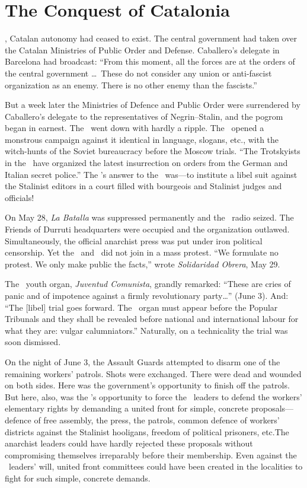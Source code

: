 \chapter{The Conquest of Catalonia}

, Catalan autonomy had ceased to exist. The central government had taken over the Catalan Ministries of Public Order and Defense. Caballero’s delegate in Barcelona had broadcast: ``From this moment, all the forces are at the orders of the central government \dots\ These do not consider any union or anti-fascist organization as an enemy. There is no other enemy than the fascists.''

But a week later the Ministries of Defence and Public Order were surrendered by Caballero’s delegate to the representatives of Negrin--Stalin, and the pogrom began in earnest. The \POUM\ went down with hardly a ripple. The \PSUC\ opened a monstrous campaign against it identical in language, slogans, etc., with the witch-hunts of the Soviet bureaucracy before the Moscow trials. ``The Trotskyists in the \POUM\ have organized the latest insurrection on orders from the German and Italian secret police.'' The \POUM’s answer to the \PSUC\ was---to institute a libel suit against the Stalinist editors in a court filled with bourgeois and Stalinist judges and officials!

On May 28, \emph{La Batalla} was suppressed permanently and the \POUM\ radio seized. The Friends of Durruti headquarters were occupied and the organization outlawed. Simultaneously, the official anarchist press was put under iron political censorship. Yet the \POUM\ and \CNT\ did not join in a mass protest. ``We formulate no protest. We only make public the facts,'' wrote \emph{Solidaridad Obrera}, May 29.

The \POUM\ youth organ, \emph{Juventud Comunista}, grandly remarked: ``These are cries of panic and of impotence against a firmly revolutionary party\dots'' (June 3). And: ``The [libel] trial goes forward. The \PSUC\ organ must appear before the Popular Tribunals and they shall be revealed before national and international labour for what they are: vulgar calumniators.'' Naturally, on a technicality the trial was soon dismissed.

On the night of June 3, the Assault Guards attempted to disarm one of the remaining workers’ patrols. Shots were exchanged. There were dead and wounded on both sides. Here was the government’s opportunity to finish off the patrols. But here, also, was the \POUM’s opportunity to force the \CNT\ leaders to defend the workers’ elementary rights by demanding a united front for simple, concrete proposals---defence of free assembly, the press, the patrols, common defence of workers’ districts against the Stalinist hooligans, freedom of political prisoners, etc.\@ The anarchist leaders could have hardly rejected these proposals without compromising themselves irreparably before their membership. Even against the \CNT\ leaders’ will, united front committees could have been created in the localities to fight for such simple, concrete demands.

